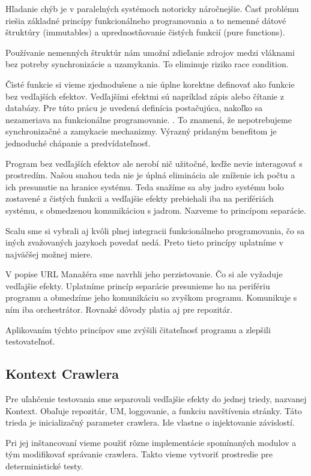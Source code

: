 Hľadanie chýb je v paralelných systémoch notoricky náročnejšie. Časť problému riešia základné princípy funkcionálneho programovania a to nemenné dátové štruktúry (immutables) a uprednostňovanie čistých funkcií (pure functions). 

Používanie nemenných štruktúr nám umožní zdieľanie zdrojov medzi vláknami bez potreby synchronizácie a uzamykania. To eliminuje riziko race condition.

Čisté funkcie si vieme zjednodušene a nie úplne korektne definovať ako funkcie bez vedľajších efektov. Vedľajšími efektmi sú napríklad zápis alebo čítanie z databázy. Pre túto prácu je uvedená definícia postačujúca, nakoľko sa nezameriava na funkcionálne programovanie. . To znamená, že nepotrebujeme synchronizačné a zamykacie mechanizmy. Výrazný pridaným benefitom je jednoduché chápanie a predvídateľnosť. 

Program bez vedľajších efektov ale nerobí nič užitočné, keďže nevie interagovať s prostredím. Našou snahou teda nie je úplná eliminácia ale zníženie ich počtu a ich presunutie na hranice systému. Teda snažíme sa aby jadro systému bolo zostavené z čistých funkcii a vedľajšie efekty prebiehali iba na perifériách systému, s obmedzenou komunikáciou s jadrom. Nazveme to princípom separácie.

Scalu sme si vybrali aj kvôli plnej integracii funkcionálneho programovania, čo sa iných zvažovaných jazykoch povedať nedá. Preto tieto princípy uplatníme v najväčšej možnej miere. 

V popise URL Manažéra sme navrhli jeho perzistovanie. Čo si ale vyžaduje vedľajšie efekty. Uplatníme princíp separácie presunieme ho na perifériu programu a obmedzíme jeho komunikáciu so zvyškom programu. Komunikuje s ním iba orchestrátor.  Rovnaké dôvody platia aj pre repozitár. 

Aplikovaním týchto princípov sme zvýšili čitateľnosť programu a zlepšili testovateľnoť.  

\subsection{Kontext Crawlera}
Pre uľahčenie testovania sme separovali vedľajšie efekty do jednej triedy, nazvanej Kontext. Obaľuje repozitár, UM, loggovanie, a funkciu navštívenia stránky. Táto trieda je inicializačný parameter crawlera. Ide vlastne o injektovanie závislostí. 

Pri jej inštancovaní vieme použiť rôzne implementácie spomínaných modulov a tým modifikovať správanie crawlera. Takto vieme vytvoriť prostredie pre deterministické testy. 

